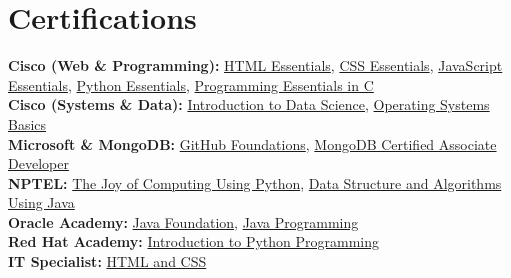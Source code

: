 \documentclass[9.5pt, letterpaper]{article}
\begin{document}
\section{Certifications}
\begingroup
\setlength{\parskip}{0pt}
\noindent\textbf{Cisco (Web \& Programming):} \href{https://drive.google.com/file/d/1wAziycAJUGoCn-medftrjyXf3j5uF5YK/view?usp=drive_link}{HTML Essentials}, \href{https://drive.google.com/file/d/1ig8VbzGE86mEPwbvJeivFt1Xr3l-pcou/view?usp=drive_link}{CSS Essentials}, \href{https://drive.google.com/file/d/1yLNkz-4EV2rr7bL8Nk0fcr8SjrTFNVD6/view?usp=drive_link}{JavaScript Essentials}, \href{https://drive.google.com/file/d/1uWAUzYSvWiwOUIN5HfilFszG-2Oeqdp2/view?usp=drive_link}{Python Essentials}, \href{https://drive.google.com/file/d/1130QQGDwppZilo5irfBfPpCRN9aOwA3L/view?usp=sharing}{Programming Essentials in C}\\
\noindent\textbf{Cisco (Systems \& Data):} \href{https://drive.google.com/file/d/1Jrtb47UdGK8Zs9Pz4uMawckqMwuFfSaP/view?usp=drive_link}{Introduction to Data Science}, \href{https://drive.google.com/file/d/1R4pdtw3A2dGMPZmSa_e9BLHMe0-YtumC/view?usp=drive_link}{Operating Systems Basics}\\
\noindent\textbf{Microsoft \& MongoDB:} \href{https://drive.google.com/file/d/1ampPWo_hKQdqehqmtV5DfocZ2_0jlwm1/view?usp=sharing}{GitHub Foundations}, \href{https://drive.google.com/file/d/1hXMR8VoA8duEx5X-wnLL5fsHIebunVfx/view?usp=sharing}{MongoDB Certified Associate Developer}\\
\noindent\textbf{NPTEL:} \href{https://drive.google.com/file/d/18-4-qHfpwvQ1I94bnqY9PMl349MNudVd/view?usp=drive_link}{The Joy of Computing Using Python}, \href{https://drive.google.com/file/d/1GDnvZZ7VnI3uCbizZP5Pq5r8hGJZ_z1h/view?usp=drive_link}{Data Structure and Algorithms Using Java}\\
\noindent\textbf{Oracle Academy:} \href{https://drive.google.com/file/d/1h-sSGyARcbbPuMGnNhv05JVg_LtuOUxk/view?usp=sharing}{Java Foundation}, \href{https://drive.google.com/file/d/1wHhdpnNaMZ2tPRvei3qd44YP4C6h1GPW/view?usp=drive_link}{Java Programming}\\
\noindent\textbf{Red Hat Academy:} \href{https://drive.google.com/file/d/12fNCIEn2vkl8_cExgSA0yeaGAVV0lnN7/view?usp=sharing}{Introduction to Python Programming}\\
\hfill\textbf{IT Specialist:} \href{https://drive.google.com/file/d/16RZFnbI9YqlgamFKHb7MCllLwOQuMZ7R/view?usp=sharing}{HTML and CSS}
\endgroup
\end{document}
